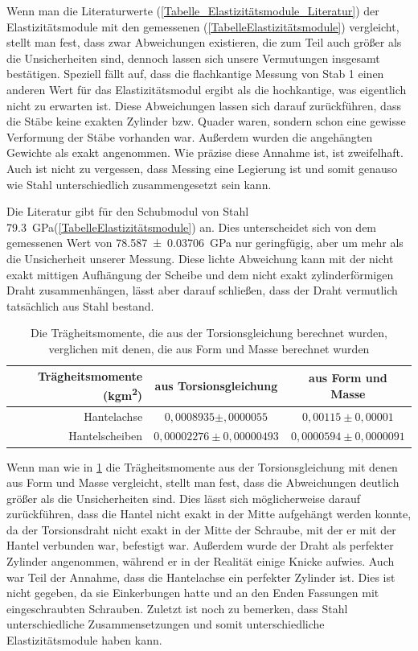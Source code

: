 \documentclass[
	a4paper,
	12pt,
	pagesize,
	ngerman
]{scrartcl}
\begin{document}
	Wenn man die Literaturwerte (\cref{Tabelle_Elastizitätsmodule_Literatur}) der Elastizitätsmodule mit den gemessenen (\cref{TabelleElastizitätsmodule}) vergleicht, stellt man fest, dass zwar Abweichungen existieren, die zum Teil auch größer als die Unsicherheiten sind, dennoch lassen sich unsere Vermutungen insgesamt bestätigen. Speziell fällt auf, dass die flachkantige Messung von Stab 1 einen anderen Wert für das Elastizitätsmodul ergibt als die hochkantige, was eigentlich nicht zu erwarten ist. Diese Abweichungen lassen sich darauf zurückführen, dass die Stäbe keine exakten Zylinder bzw. Quader waren, sondern schon eine gewisse Verformung der Stäbe vorhanden war. Außerdem wurden die angehängten Gewichte als exakt angenommen. Wie präzise diese Annahme ist, ist zweifelhaft. Auch ist nicht zu vergessen, dass Messing eine Legierung ist und somit genauso wie Stahl unterschiedlich zusammengesetzt sein kann. %
	\par
	Die Literatur gibt für den Schubmodul von Stahl \SI{79,3}{\giga \pascal}(\cref{TabelleElastizitätsmodule}) an. Dies unterscheidet sich von dem gemessenen Wert von \SI{78,587\pm 0,03706}{\giga \pascal} nur geringfügig, aber um mehr als die Unsicherheit unserer Messung. Diese lichte Abweichung kann mit der nicht exakt mittigen Aufhängung der Scheibe und dem nicht exakt zylinderförmigen Draht zusammenhängen, lässt aber darauf schließen, dass der Draht vermutlich tatsächlich aus Stahl bestand.
	\par
	\begin{table}[tb]
		\centering
		\begin{tabular}{ r | c | c |}
			Trägheitsmomente (\si{kgm^2})& aus Torsionsgleichung & aus Form und Masse\\ \hline
			Hantelachse & $0,0008935 \pm ,0000055$ &$ 0,00115 \pm0,00001$\\
			Hantelscheiben & $0,00002276 \pm 0,00000493$ & $0,0000594\pm 0,0000091$\\ \hline
		\end{tabular}
		\caption{Die Trägheitsmomente, die aus der Torsionsgleichung berechnet wurden, verglichen mit denen, die aus Form und Masse berechnet wurden}
		\label{Trägheitsmomente_Vergleich} 
	\end{table}
	
	Wenn man wie in \cref{Trägheitsmomente_Vergleich} die Trägheitsmomente aus der Torsionsgleichung mit denen aus Form und Masse vergleicht, stellt man fest, dass die Abweichungen deutlich größer als die Unsicherheiten sind.
	Dies lässt sich möglicherweise darauf zurückführen, dass die Hantel nicht exakt in der Mitte aufgehängt werden konnte, da der Torsionsdraht nicht exakt in der Mitte der Schraube, mit der er mit der Hantel verbunden war, befestigt war.
	Außerdem wurde der Draht als perfekter Zylinder angenommen, während er in der Realität einige Knicke aufwies.
	Auch war Teil der Annahme, dass die Hantelachse ein perfekter Zylinder ist.
	Dies ist nicht gegeben, da sie Einkerbungen hatte und an den Enden Fassungen mit eingeschraubten Schrauben.
	Zuletzt ist noch zu bemerken, dass Stahl unterschiedliche Zusammensetzungen und somit unterschiedliche  Elastizitätsmodule haben kann.
	
\end{document}
